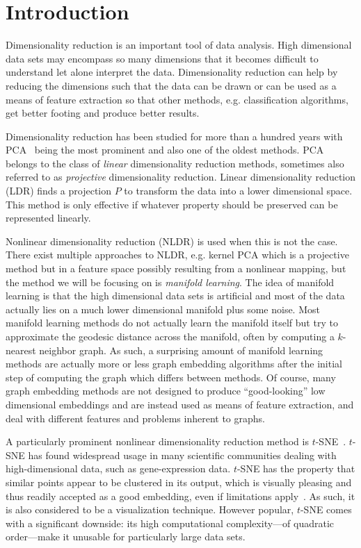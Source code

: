 \chapter{Introduction}\label{ch:intro}

Dimensionality reduction is an important tool of data analysis. High dimensional
data sets may encompass so many dimensions that it becomes difficult to understand
let alone interpret the data. Dimensionality reduction can help by reducing the dimensions
such that the data can be drawn or can be used as a means of feature extraction so that
other methods, e.g. classification algorithms, get better footing and produce better
results.

Dimensionality reduction has been studied for more than a hundred years with PCA~\cite{pearson_pca}
being the most prominent and also one of the oldest methods. PCA belongs to the
class of \emph{linear} dimensionality reduction methods, sometimes also referred
to as \emph{projective} dimensionality reduction. Linear dimensionality reduction (LDR)
finds a projection $P$ to transform the data into a lower dimensional space. This
method is only effective if whatever property should be preserved can be represented
linearly.

Nonlinear dimensionality reduction (NLDR) is used when this is not the case. There
exist multiple approaches to NLDR, e.g. kernel PCA which is a projective method but
in a feature space possibly resulting from a nonlinear mapping, but the method we will
be focusing on is \emph{manifold learning}. The idea of manifold learning is that
the high dimensional data sets is artificial and most of the data actually lies on
a much lower dimensional manifold plus some noise. Most manifold learning methods
do not actually learn the manifold itself but try to approximate the geodesic distance
across the manifold, often by computing a $k$-nearest neighbor graph. As such, a surprising
amount of manifold learning methods are actually more or less graph embedding algorithms after
the initial step of computing the graph which differs between methods. Of course, many graph
embedding methods are not designed to produce ``good-looking'' low dimensional embeddings
and are instead used as means of feature extraction, and deal with different features and problems inherent
to graphs.

A particularly prominent nonlinear dimensionality reduction method is
$t$-SNE~\cite{tsne}.  $t$-SNE has found widespread usage in many scientific
communities dealing with high-dimensional data, such as gene-expression data.
$t$-SNE has the property that similar points appear to be clustered in its
output, which is visually pleasing and thus readily accepted as a good
embedding, even if limitations apply~\cite{art_tsne,misread_tsne}. As such, it
is also considered to be a visualization technique. However popular, $t$-SNE
comes with a significant downside: its high computational complexity---of
quadratic order---make it unusable for particularly large data sets.

